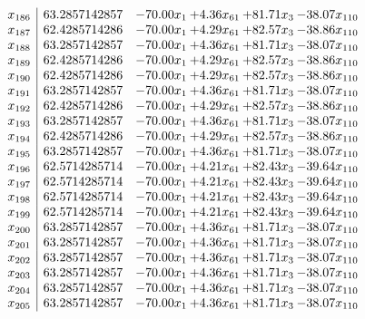 \documentclass[8pt]{article}
\begin{document}
\[\begin{array}{c| c c@{\hskip 2pt} c@{\hskip 2pt} c@{\hskip 2pt} c@{\hskip 2pt} }
 x_{186}   &  63.2857142857 & -70.00 x_{1} & +  4.36 x_{61} & + 81.71 x_{3} & -38.07 x_{110}\\
 x_{187}   &  62.4285714286 & -70.00 x_{1} & +  4.29 x_{61} & + 82.57 x_{3} & -38.86 x_{110}\\
 x_{188}   &  63.2857142857 & -70.00 x_{1} & +  4.36 x_{61} & + 81.71 x_{3} & -38.07 x_{110}\\
 x_{189}   &  62.4285714286 & -70.00 x_{1} & +  4.29 x_{61} & + 82.57 x_{3} & -38.86 x_{110}\\
 x_{190}   &  62.4285714286 & -70.00 x_{1} & +  4.29 x_{61} & + 82.57 x_{3} & -38.86 x_{110}\\
 x_{191}   &  63.2857142857 & -70.00 x_{1} & +  4.36 x_{61} & + 81.71 x_{3} & -38.07 x_{110}\\
 x_{192}   &  62.4285714286 & -70.00 x_{1} & +  4.29 x_{61} & + 82.57 x_{3} & -38.86 x_{110}\\
 x_{193}   &  63.2857142857 & -70.00 x_{1} & +  4.36 x_{61} & + 81.71 x_{3} & -38.07 x_{110}\\
 x_{194}   &  62.4285714286 & -70.00 x_{1} & +  4.29 x_{61} & + 82.57 x_{3} & -38.86 x_{110}\\
 x_{195}   &  63.2857142857 & -70.00 x_{1} & +  4.36 x_{61} & + 81.71 x_{3} & -38.07 x_{110}\\
 x_{196}   &  62.5714285714 & -70.00 x_{1} & +  4.21 x_{61} & + 82.43 x_{3} & -39.64 x_{110}\\
 x_{197}   &  62.5714285714 & -70.00 x_{1} & +  4.21 x_{61} & + 82.43 x_{3} & -39.64 x_{110}\\
 x_{198}   &  62.5714285714 & -70.00 x_{1} & +  4.21 x_{61} & + 82.43 x_{3} & -39.64 x_{110}\\
 x_{199}   &  62.5714285714 & -70.00 x_{1} & +  4.21 x_{61} & + 82.43 x_{3} & -39.64 x_{110}\\
 x_{200}   &  63.2857142857 & -70.00 x_{1} & +  4.36 x_{61} & + 81.71 x_{3} & -38.07 x_{110}\\
 x_{201}   &  63.2857142857 & -70.00 x_{1} & +  4.36 x_{61} & + 81.71 x_{3} & -38.07 x_{110}\\
 x_{202}   &  63.2857142857 & -70.00 x_{1} & +  4.36 x_{61} & + 81.71 x_{3} & -38.07 x_{110}\\
 x_{203}   &  63.2857142857 & -70.00 x_{1} & +  4.36 x_{61} & + 81.71 x_{3} & -38.07 x_{110}\\
 x_{204}   &  63.2857142857 & -70.00 x_{1} & +  4.36 x_{61} & + 81.71 x_{3} & -38.07 x_{110}\\
 x_{205}   &  63.2857142857 & -70.00 x_{1} & +  4.36 x_{61} & + 81.71 x_{3} & -38.07 x_{110}\\

\end{array}\]
\end{document}
